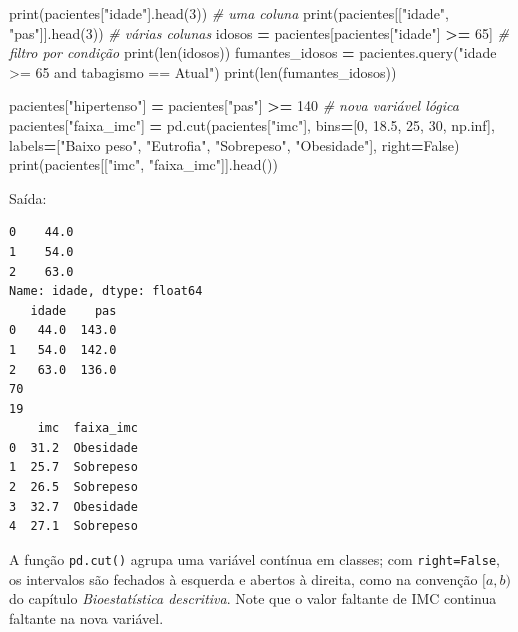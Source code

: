 \documentclass[
]{book}
\newenvironment{Shaded}{\begin{snugshade}}{\end{snugshade}}
\newcommand{\BuiltInTok}[1]{#1}
\newcommand{\CommentTok}[1]{\textcolor[rgb]{0.56,0.35,0.01}{\textit{#1}}}
\newcommand{\DecValTok}[1]{\textcolor[rgb]{0.00,0.00,0.81}{#1}}
\newcommand{\FloatTok}[1]{\textcolor[rgb]{0.00,0.00,0.81}{#1}}
\newcommand{\NormalTok}[1]{#1}
\newcommand{\OperatorTok}[1]{\textcolor[rgb]{0.81,0.36,0.00}{\textbf{#1}}}
\newcommand{\StringTok}[1]{\textcolor[rgb]{0.31,0.60,0.02}{#1}}
\newcommand{\VariableTok}[1]{\textcolor[rgb]{0.00,0.00,0.00}{#1}}
\begin{document}
\begin{Shaded}
\begin{Highlighting}[]
\BuiltInTok{print}\NormalTok{(pacientes[}\StringTok{"idade"}\NormalTok{].head(}\DecValTok{3}\NormalTok{))                       }\CommentTok{\# uma coluna}
\BuiltInTok{print}\NormalTok{(pacientes[[}\StringTok{"idade"}\NormalTok{, }\StringTok{"pas"}\NormalTok{]].head(}\DecValTok{3}\NormalTok{))              }\CommentTok{\# várias colunas}
\NormalTok{idosos }\OperatorTok{=}\NormalTok{ pacientes[pacientes[}\StringTok{"idade"}\NormalTok{] }\OperatorTok{\textgreater{}=} \DecValTok{65}\NormalTok{]            }\CommentTok{\# filtro por condição}
\BuiltInTok{print}\NormalTok{(}\BuiltInTok{len}\NormalTok{(idosos))}
\NormalTok{fumantes\_idosos }\OperatorTok{=}\NormalTok{ pacientes.query(}\StringTok{"idade \textgreater{}= 65 and tabagismo == \textquotesingle{}Atual\textquotesingle{}"}\NormalTok{)}
\BuiltInTok{print}\NormalTok{(}\BuiltInTok{len}\NormalTok{(fumantes\_idosos))}

\NormalTok{pacientes[}\StringTok{"hipertenso"}\NormalTok{] }\OperatorTok{=}\NormalTok{ pacientes[}\StringTok{"pas"}\NormalTok{] }\OperatorTok{\textgreater{}=} \DecValTok{140}       \CommentTok{\# nova variável lógica}
\NormalTok{pacientes[}\StringTok{"faixa\_imc"}\NormalTok{] }\OperatorTok{=}\NormalTok{ pd.cut(pacientes[}\StringTok{"imc"}\NormalTok{], bins}\OperatorTok{=}\NormalTok{[}\DecValTok{0}\NormalTok{, }\FloatTok{18.5}\NormalTok{, }\DecValTok{25}\NormalTok{, }\DecValTok{30}\NormalTok{, np.inf],}
\NormalTok{                                labels}\OperatorTok{=}\NormalTok{[}\StringTok{"Baixo peso"}\NormalTok{, }\StringTok{"Eutrofia"}\NormalTok{, }\StringTok{"Sobrepeso"}\NormalTok{, }\StringTok{"Obesidade"}\NormalTok{],}
\NormalTok{                                right}\OperatorTok{=}\VariableTok{False}\NormalTok{)}
\BuiltInTok{print}\NormalTok{(pacientes[[}\StringTok{"imc"}\NormalTok{, }\StringTok{"faixa\_imc"}\NormalTok{]].head())}
\end{Highlighting}
\end{Shaded}

Saída:

\begin{verbatim}
0    44.0
1    54.0
2    63.0
Name: idade, dtype: float64
   idade    pas
0   44.0  143.0
1   54.0  142.0
2   63.0  136.0
70
19
    imc  faixa_imc
0  31.2  Obesidade
1  25.7  Sobrepeso
2  26.5  Sobrepeso
3  32.7  Obesidade
4  27.1  Sobrepeso
\end{verbatim}

A função \texttt{pd.cut()} agrupa uma variável contínua em classes; com \texttt{right=False}, os intervalos são fechados à esquerda e abertos à direita, como na convenção \([a, b)\) do capítulo \emph{Bioestatística descritiva}. Note que o valor faltante de IMC continua faltante na nova variável.
\end{document}

